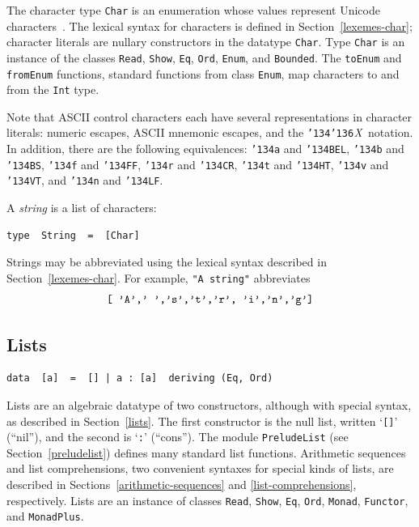 The character type \mbox{\tt Char}
is an enumeration whose values represent Unicode characters~\cite{unicode}.
The lexical syntax for
characters is defined in Section~\ref{lexemes-char}; character
literals are nullary constructors in the datatype \mbox{\tt Char}.  Type \mbox{\tt Char}
is an instance of the classes \mbox{\tt Read}, \mbox{\tt Show}, \mbox{\tt Eq}, \mbox{\tt Ord}, 
\mbox{\tt Enum}, and \mbox{\tt Bounded}.  The \mbox{\tt toEnum} and \mbox{\tt fromEnum} functions,
standard functions from class \mbox{\tt Enum}, map characters to and from the
\mbox{\tt Int} type.

Note that ASCII control characters each have several representations
in character literals: numeric escapes, ASCII mnemonic escapes,
and the \mbox{\tt {\char'134}{\char'136}}\mbox{$\it X$} notation.
In addition, there are the following equivalences:
\mbox{\tt {\char'134}a} and \mbox{\tt {\char'134}BEL}, \mbox{\tt {\char'134}b} and \mbox{\tt {\char'134}BS}, \mbox{\tt {\char'134}f} and \mbox{\tt {\char'134}FF}, \mbox{\tt {\char'134}r} and \mbox{\tt {\char'134}CR},
\mbox{\tt {\char'134}t} and \mbox{\tt {\char'134}HT}, \mbox{\tt {\char'134}v} and \mbox{\tt {\char'134}VT}, and \mbox{\tt {\char'134}n} and \mbox{\tt {\char'134}LF}.

A {\em string} is a list of characters:\nopagebreak[4]
\bprog
{\small\begin{verbatim}
type  String  =  [Char]
\end{verbatim}}
\eprog
{}
Strings may be abbreviated using the lexical syntax described in
Section~\ref{lexemes-char}.  For example, \mbox{\tt "A\ string"} abbreviates
\[
\mbox{\tt [\ 'A','\ ','s','t','r',\ 'i','n','g']}
\]

\subsection{Lists}
\label{basic-lists}
\bprog
{\small\begin{verbatim}
data  [a]  =  [] | a : [a]  deriving (Eq, Ord)
\end{verbatim}}
\eprog
Lists are an algebraic datatype of two constructors, although
with special syntax, as described in Section~\ref{lists}.
The first constructor is the null list, written `\mbox{\tt []}' (``nil''),
%
and the second is `\mbox{\tt :}' (``cons'').
\indextt{:}
The module \mbox{\tt PreludeList} (see Section~\ref{preludelist})
defines many standard list functions.  
Arithmetic sequences
and list comprehensions,
two convenient
syntaxes for special kinds of lists, are described in
Sections~\ref{arithmetic-sequences} and \ref{list-comprehensions},
respectively.  Lists are an instance of classes \mbox{\tt Read}, \mbox{\tt Show}, \mbox{\tt Eq}, \mbox{\tt Ord}, 
\mbox{\tt Monad}, \mbox{\tt Functor}, and \mbox{\tt MonadPlus}.

